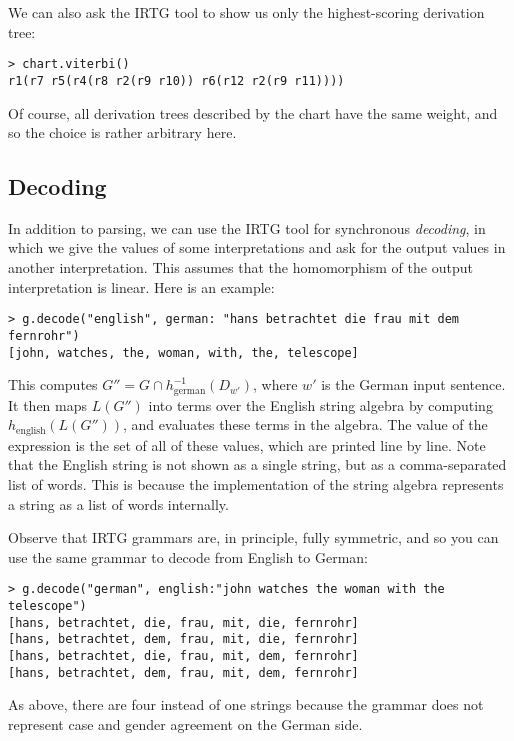 \documentclass[11pt]{article}
\begin{document}
We can also ask the IRTG tool to show us only the highest-scoring
derivation tree:

\begin{verbatim}
> chart.viterbi()
r1(r7 r5(r4(r8 r2(r9 r10)) r6(r12 r2(r9 r11))))
\end{verbatim}

Of course, all derivation trees described by the chart have the same
weight, and so the choice is rather arbitrary here.

\subsection{Decoding}

In addition to parsing, we can use the IRTG tool for synchronous
\emph{decoding}, in which we give the values of some interpretations
and ask for the output values in another interpretation. This assumes
that the homomorphism of the output interpretation is linear.  Here is
an example:

\begin{verbatim}
> g.decode("english", german: "hans betrachtet die frau mit dem fernrohr")
[john, watches, the, woman, with, the, telescope]
\end{verbatim}

This computes $G'' = G \cap h^{-1}_\mathrm{german}(D_{w'})$, where
$w'$ is the German input sentence. It then maps $L(G'')$ into terms
over the English string algebra by computing
$h_\mathrm{english}(L(G''))$, and evaluates these terms in the
algebra. The value of the expression is the set of all of these
values, which are printed line by line. Note that the English string
is not shown as a single string, but as a comma-separated list of
words.  This is because the implementation of the string algebra
represents a string as a list of words internally.

Observe that IRTG grammars are, in principle, fully symmetric, and so
you can use the same grammar to decode from English to German:

\begin{verbatim}
> g.decode("german", english:"john watches the woman with the telescope")
[hans, betrachtet, die, frau, mit, die, fernrohr]
[hans, betrachtet, dem, frau, mit, die, fernrohr]
[hans, betrachtet, die, frau, mit, dem, fernrohr]
[hans, betrachtet, dem, frau, mit, dem, fernrohr]
\end{verbatim}

As above, there are four instead of one strings because the grammar does
not represent case and gender agreement on the German side.
\end{document}
